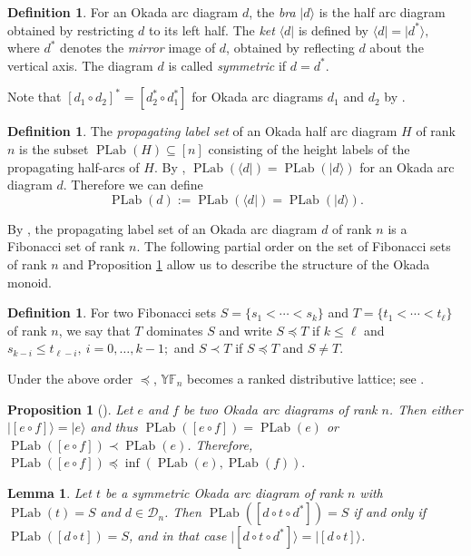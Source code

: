 \documentclass[12pt,reqno]{amsart}
\numberwithin{equation}{section}
\newtheorem{lemma}[theorem]{Lemma}
\newtheorem{proposition}[theorem]{Proposition}
\theoremstyle{definition}
\newtheorem{definition}[theorem]{Definition}
\theoremstyle{definition}
\newcommand{\YF}{\mathbb{YF}}
\newcommand{\PLab}{\operatorname{PLab}}
\begin{document}
\begin{definition}
For an Okada arc diagram $d$, the \emph{bra} $|d \rangle$ is the half
arc diagram obtained by restricting $d$ to its left half. The
\emph{ket} $\langle d|$ is defined by
$
\langle d| =| d^*\rangle,$
where $d^*$ denotes the \emph{mirror} image of $d$, obtained by reflecting $d$ about the vertical axis. The diagram $d$ is called \emph{symmetric} if $d=d^*$.
\end{definition}
Note that $[d_1 \circ d_2]^*=[d_2^* \circ d_1^*]$ for Okada arc diagrams $d_1$ and $d_2$ by \cite[Remark 3.47]{HivertScott}. 
\begin{definition}
The \emph{propagating label set} of an Okada half arc diagram $H$ of rank $n$ is the subset
$\PLab(H)\subseteq [n]$
consisting of the height labels of the propagating half-arcs of $H$. By \cite[Lemma 4.4]{HivertScott}, $\PLab(\langle d|)=\PLab(|d\rangle)$ for an Okada arc diagram $d$. Therefore we can define
\[
\PLab(d):=\PLab(\langle d|)=\PLab(|d\rangle).
\]
\end{definition}
By \cite[Proposition 4.7]{HivertScott}, the propagating label set of an Okada arc diagram $d$ of rank $n$ is a Fibonacci set of rank $n$.
The following partial order on the set of Fibonacci sets of rank $n$ and Proposition \ref{structure} allow us to describe the structure of the Okada monoid.
\begin{definition} 
    For two Fibonacci sets $S=\{s_1< \cdots< s_k\}$ and $T=\{t_1< \cdots< t_\ell\}$ of rank $n$, we say that $T$ dominates $S$ and write $S \preccurlyeq T$ if $k \leq \ell$ and $s_{k-i} \leq t_{\ell-i}, ~i=0, \ldots, k-1;$ and $S \prec T$ if $S \preccurlyeq T$ and $S \neq T$.
\end{definition} 
Under the above order $\preccurlyeq$, $\YF_n$ becomes a ranked distributive lattice; see \cite[Proposition 5.2]{HivertScott}.
\begin{proposition}[{\cite[Lemma 5.11 and Corollary 5.12]{HivertScott}}]\label{structure}
    Let $e$ and $f$ be two Okada arc diagrams of rank $n$. Then either $| [e \circ f]\rangle = | e \rangle$ and thus $\PLab([e \circ f])= \PLab(e)$ or $\PLab([e \circ f]) \prec \PLab(e)$. Therefore, $\PLab([e \circ f ]) \preccurlyeq \inf (\PLab(e), \PLab(f)).$
\end{proposition}
\begin{lemma}\label{halves}
Let $t$ be a symmetric Okada arc diagram of rank $n$ with $\PLab(t)=S$ and $d\in\mathcal D_n$. Then
$\PLab([d\circ t\circ d^*])=S$ if and only if $\PLab([d\circ t])=S$, and in
that case $\bigl|[d\circ t\circ d^*]\bigr\rangle=\bigl|[d\circ t]\bigr\rangle$.
\end{lemma}
\end{document}
